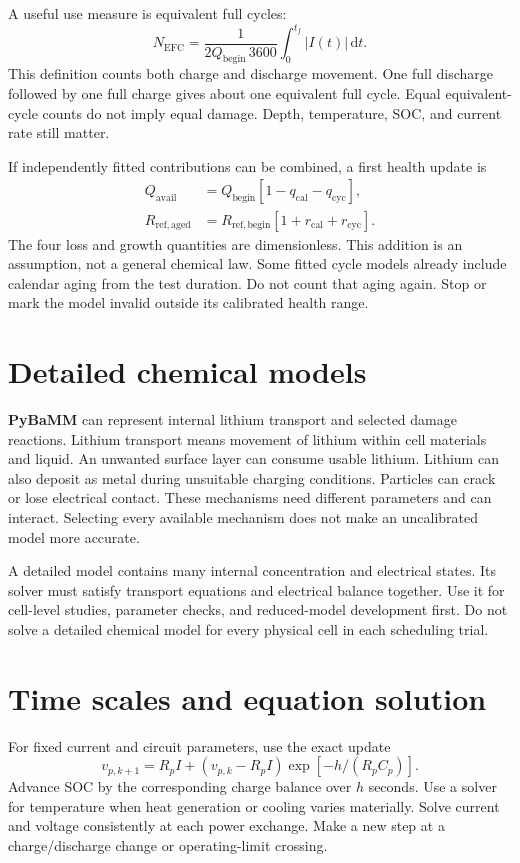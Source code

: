\documentclass[11pt,a4paper]{report}
\newcommand{\dd}{\mathrm{d}}
\begin{document}
A useful use measure is equivalent full cycles:
\begin{equation}
N_{\mathrm{EFC}}=\frac{1}{2Q_{\mathrm{begin}}\,3600}
\int_0^{t_f}|I(t)|\,\dd t.
\end{equation}
This definition counts both charge and discharge movement.
One full discharge followed by one full charge gives about one equivalent full cycle.
Equal equivalent-cycle counts do not imply equal damage.
Depth, temperature, SOC, and current rate still matter.

If independently fitted contributions can be combined, a first health update is
\begin{align}
Q_{\mathrm{avail}}&=Q_{\mathrm{begin}}[1-q_{\mathrm{cal}}-q_{\mathrm{cyc}}],\\
R_{\mathrm{ref,aged}}&=R_{\mathrm{ref,begin}}[1+r_{\mathrm{cal}}+r_{\mathrm{cyc}}].
\end{align}
The four loss and growth quantities are dimensionless.
This addition is an assumption, not a general chemical law.
Some fitted cycle models already include calendar aging from the test duration.
Do not count that aging again.
Stop or mark the model invalid outside its calibrated health range.

\section{Detailed chemical models}
\textbf{PyBaMM} can represent internal lithium transport and selected damage reactions.
Lithium transport means movement of lithium within cell materials and liquid.
An unwanted surface layer can consume usable lithium.
Lithium can also deposit as metal during unsuitable charging conditions.
Particles can crack or lose electrical contact.
These mechanisms need different parameters and can interact.
Selecting every available mechanism does not make an uncalibrated model more accurate.

A detailed model contains many internal concentration and electrical states.
Its solver must satisfy transport equations and electrical balance together.
Use it for cell-level studies, parameter checks, and reduced-model development first.
Do not solve a detailed chemical model for every physical cell in each scheduling trial.

\section{Time scales and equation solution}
For fixed current and circuit parameters, use the exact update
\begin{equation}
v_{p,k+1}=R_pI+(v_{p,k}-R_pI)\exp[-h/(R_pC_p)].
\end{equation}
Advance SOC by the corresponding charge balance over $h$ seconds.
Use a solver for temperature when heat generation or cooling varies materially.
Solve current and voltage consistently at each power exchange.
Make a new step at a charge/discharge change or operating-limit crossing.
\end{document}

